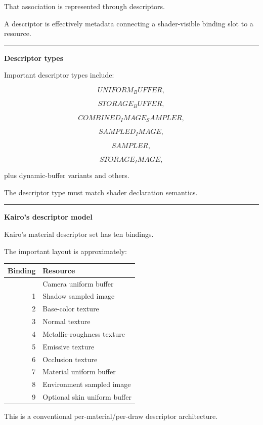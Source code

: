 That association is represented through descriptors.

A descriptor is effectively metadata connecting a shader-visible binding slot to a resource.

\begin{center}\rule{0.5\linewidth}{0.5pt}\end{center}

\textbf{Descriptor types}

Important descriptor types include:

\[
UNIFORM_BUFFER,
\]

\[
STORAGE_BUFFER,
\]

\[
COMBINED_IMAGE_SAMPLER,
\]

\[
SAMPLED_IMAGE,
\]

\[
SAMPLER,
\]

\[
STORAGE_IMAGE,
\]

plus dynamic-buffer variants and others.

The descriptor type must match shader declaration semantics.

\begin{center}\rule{0.5\linewidth}{0.5pt}\end{center}

\textbf{Kairo's descriptor model}

Kairo's material descriptor set has ten bindings.

The important layout is approximately:

{\def\LTcaptype{none} %
\begin{longtable}[]{@{}rl@{}}
\toprule\noalign{}
Binding & Resource \\
\midrule\noalign{}
\endhead
\bottomrule\noalign{}
\endlastfoot
0 & Camera uniform buffer \\
1 & Shadow sampled image \\
2 & Base-color texture \\
3 & Normal texture \\
4 & Metallic-roughness texture \\
5 & Emissive texture \\
6 & Occlusion texture \\
7 & Material uniform buffer \\
8 & Environment sampled image \\
9 & Optional skin uniform buffer \\
\end{longtable}
}

This is a conventional per-material/per-draw descriptor architecture.

